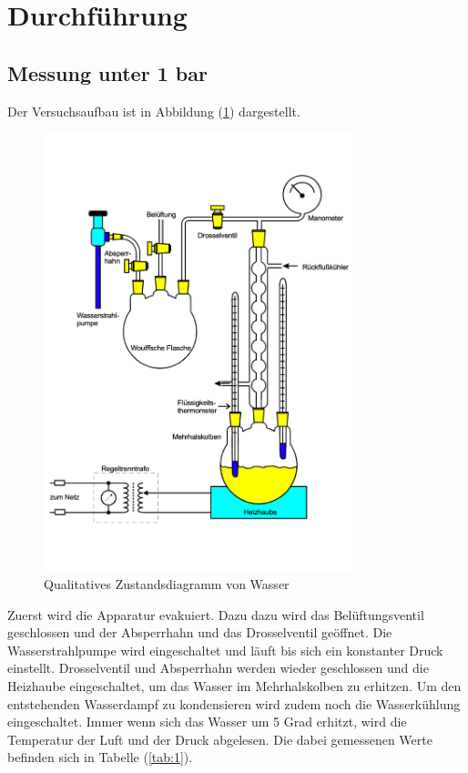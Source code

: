 \newpage
\section{Durchführung}
\subsection{Messung unter 1 bar}
Der Versuchsaufbau ist in Abbildung (\ref{fig:aufbau1}) dargestellt.

\begin{figure}
    \centering
    \includegraphics[width=9cm]{aufbau1.pdf}
    \caption{Qualitatives Zustandsdiagramm von Wasser \cite{V203}}
    \label{fig:aufbau1}
  \end{figure}

\noindent
Zuerst wird die Apparatur evakuiert.
Dazu dazu wird das Belüftungsventil geschlossen und der Absperrhahn und das Drosselventil geöffnet. 
Die Wasserstrahlpumpe wird eingeschaltet und läuft bis sich ein konstanter Druck einstellt.
Drosselventil und Absperrhahn werden wieder geschlossen und die Heizhaube eingeschaltet, um das
Wasser im Mehrhalskolben zu erhitzen.
Um den entstehenden Wasserdampf zu kondensieren wird zudem noch die Wasserkühlung eingeschaltet.
Immer wenn sich das Wasser um 5 Grad erhitzt, wird die Temperatur der Luft und der Druck abgelesen.
Die dabei gemessenen Werte befinden sich in Tabelle (\ref{tab:1}). 



